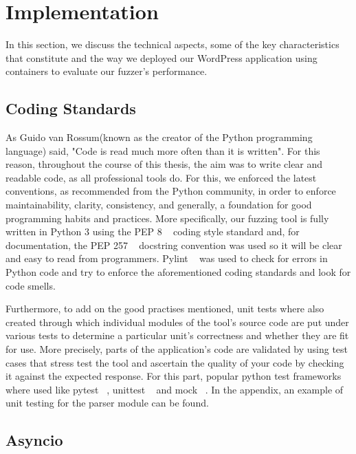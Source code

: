 \chapter{Implementation}
\label{sec:implementation}
\minitoc
\vspace*{1cm}

In this section, we discuss the technical aspects, some of
the key characteristics that constitute \pname{} and the way
we deployed our WordPress application using containers to
evaluate our fuzzer’s performance.


\section{Coding Standards}
As Guido van Rossum(known as the creator of the Python programming language) said, "Code is read much more often than it is written". For this reason, throughout the course of this thesis, the aim was to write clear and readable code, as all professional tools do. For this, we enforced the latest conventions, as recommended from the Python community, in order to enforce maintainability, clarity, consistency, and generally, a foundation for good programming habits and practices. More specifically, our fuzzing tool is fully written in Python 3 using the PEP 8 ~\cite{python_pep8} coding style standard and, for documentation, the PEP 257 ~\cite{python_pep257} docstring convention was used so it will be clear and easy to read from programmers. Pylint ~\cite{pylint_module} was used to check for errors in Python code and try to enforce the aforementioned coding standards and look for code smells.

Furthermore, to add on the good practises mentioned, unit tests where also created through which individual modules of the tool's source code are put under various tests to determine a particular unit's correctness and whether they are fit for use. More precisely, parts of the application's code are validated by using test cases that stress test the tool and ascertain the quality of your code by checking it against the expected response. For this part, popular python test frameworks where used like pytest ~\cite{pytest_module}, unittest ~\cite{unittest_module} and mock ~\cite{mock}. In the appendix, an example of unit testing for the parser module can be found.


\section{Asyncio}


